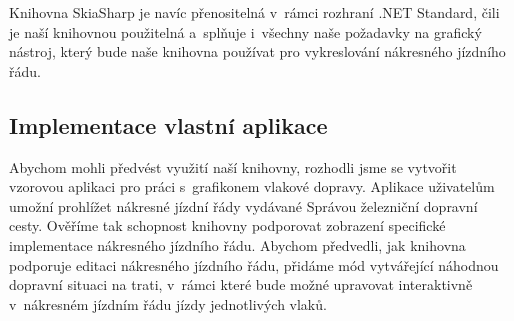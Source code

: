 Knihovna SkiaSharp je navíc přenositelná v~rámci rozhraní .NET Standard, čili je naší knihovnou použitelná a~splňuje i~všechny naše požadavky na grafický nástroj, který bude naše knihovna používat pro vykreslování nákresného jízdního řádu.

\subsection*{Implementace vlastní aplikace}
Abychom mohli předvést využití naší knihovny, rozhodli jsme se vytvořit vzorovou aplikaci pro práci s~grafikonem vlakové dopravy. Aplikace uživatelům umožní prohlížet nákresné jízdní řády vydávané Správou železniční dopravní cesty. Ověříme tak schopnost knihovny podporovat zobrazení specifické implementace nákresného jízdního řádu. Abychom předvedli, jak knihovna podporuje editaci nákresného jízdního řádu, přidáme mód vytvářející náhodnou dopravní situaci na trati, v~rámci které bude možné upravovat interaktivně v~nákresném jízdním řádu jízdy jednotlivých vlaků.

